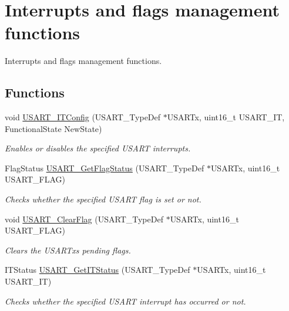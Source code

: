 \hypertarget{group___u_s_a_r_t___group9}{}\section{Interrupts and flags management functions}
\label{group___u_s_a_r_t___group9}


Interrupts and flags management functions.  


\subsection*{Functions}
\begin{DoxyCompactItemize}
\item 
void \mbox{\hyperlink{group___u_s_a_r_t___group9_ga6d8f2dd1f34060ae7e386e3e5d56b6f6}{U\+S\+A\+R\+T\+\_\+\+I\+T\+Config}} (U\+S\+A\+R\+T\+\_\+\+Type\+Def $\ast$U\+S\+A\+R\+Tx, uint16\+\_\+t U\+S\+A\+R\+T\+\_\+\+IT, Functional\+State New\+State)
\begin{DoxyCompactList}\small\item\em Enables or disables the specified U\+S\+A\+RT interrupts. \end{DoxyCompactList}\item 
Flag\+Status \mbox{\hyperlink{group___u_s_a_r_t___group9_ga144630722defc9e312f0ad280b68e9da}{U\+S\+A\+R\+T\+\_\+\+Get\+Flag\+Status}} (U\+S\+A\+R\+T\+\_\+\+Type\+Def $\ast$U\+S\+A\+R\+Tx, uint16\+\_\+t U\+S\+A\+R\+T\+\_\+\+F\+L\+AG)
\begin{DoxyCompactList}\small\item\em Checks whether the specified U\+S\+A\+RT flag is set or not. \end{DoxyCompactList}\item 
void \mbox{\hyperlink{group___u_s_a_r_t___group9_gad962e148fc466ae1b45b288f6c91d966}{U\+S\+A\+R\+T\+\_\+\+Clear\+Flag}} (U\+S\+A\+R\+T\+\_\+\+Type\+Def $\ast$U\+S\+A\+R\+Tx, uint16\+\_\+t U\+S\+A\+R\+T\+\_\+\+F\+L\+AG)
\begin{DoxyCompactList}\small\item\em Clears the U\+S\+A\+R\+Tx\textquotesingle{}s pending flags. \end{DoxyCompactList}\item 
I\+T\+Status \mbox{\hyperlink{group___u_s_a_r_t___group9_ga93d8f031241bcdbe938d091a85295445}{U\+S\+A\+R\+T\+\_\+\+Get\+I\+T\+Status}} (U\+S\+A\+R\+T\+\_\+\+Type\+Def $\ast$U\+S\+A\+R\+Tx, uint16\+\_\+t U\+S\+A\+R\+T\+\_\+\+IT)
\begin{DoxyCompactList}\small\item\em Checks whether the specified U\+S\+A\+RT interrupt has occurred or not. \end{DoxyCompactList}\item 

\end{DoxyCompactItemize}
